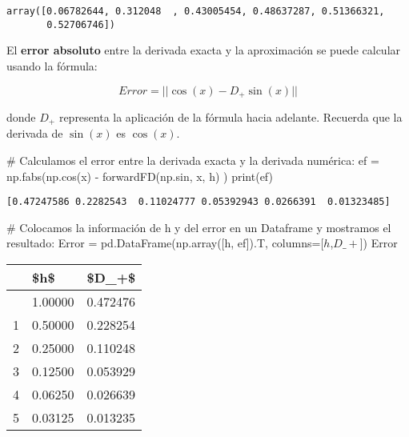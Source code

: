 \documentclass[
  letterpaper,
  DIV=11,
  numbers=noendperiod]{scrreprt}
\newenvironment{Shaded}{\begin{snugshade}}{\end{snugshade}}
\newcommand{\BuiltInTok}[1]{\textcolor[rgb]{0.00,0.23,0.31}{#1}}
\newcommand{\CommentTok}[1]{\textcolor[rgb]{0.37,0.37,0.37}{#1}}
\newcommand{\NormalTok}[1]{\textcolor[rgb]{0.00,0.23,0.31}{#1}}
\newcommand{\OperatorTok}[1]{\textcolor[rgb]{0.37,0.37,0.37}{#1}}
\newcommand{\StringTok}[1]{\textcolor[rgb]{0.13,0.47,0.30}{#1}}
\begin{document}
\begin{verbatim}
array([0.06782644, 0.312048  , 0.43005454, 0.48637287, 0.51366321,
       0.52706746])
\end{verbatim}

El \textbf{error absoluto} entre la derivada exacta y la aproximación se
puede calcular usando la fórmula:

\[
Error = || \cos(x) - D_+ \sin(x)||
\]

donde \(D_+\) representa la aplicación de la fórmula hacia adelante.
Recuerda que la derivada de \(\sin(x)\) es \(\cos(x)\).

\begin{Shaded}
\begin{Highlighting}[]
\CommentTok{\# Calculamos el error entre la derivada exacta y la derivada numérica:}
\NormalTok{ef }\OperatorTok{=}\NormalTok{ np.fabs(np.cos(x) }\OperatorTok{{-}}\NormalTok{ forwardFD(np.sin, x, h) )}
\BuiltInTok{print}\NormalTok{(ef)}
\end{Highlighting}
\end{Shaded}

\begin{verbatim}
[0.47247586 0.2282543  0.11024777 0.05392943 0.0266391  0.01323485]
\end{verbatim}

\begin{Shaded}
\begin{Highlighting}[]
\CommentTok{\# Colocamos la información de h y del error en un Dataframe y mostramos el resultado:}
\NormalTok{Error }\OperatorTok{=}\NormalTok{ pd.DataFrame(np.array([h, ef]).T, }
\NormalTok{                     columns}\OperatorTok{=}\NormalTok{[}\StringTok{\textquotesingle{}$h$\textquotesingle{}}\NormalTok{,}\StringTok{\textquotesingle{}$D\_+$\textquotesingle{}}\NormalTok{])}
\NormalTok{Error}
\end{Highlighting}
\end{Shaded}

\begin{longtable}[]{@{}lll@{}}
\toprule\noalign{}
& \$h\$ & \$D\_+\$ \\
\midrule\noalign{}
\endhead
\bottomrule\noalign{}
\endlastfoot
0 & 1.00000 & 0.472476 \\
1 & 0.50000 & 0.228254 \\
2 & 0.25000 & 0.110248 \\
3 & 0.12500 & 0.053929 \\
4 & 0.06250 & 0.026639 \\
5 & 0.03125 & 0.013235 \\
\end{longtable}
\end{document}
